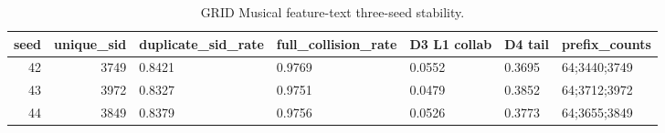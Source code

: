 \begin{table}
\caption{GRID Musical feature-text three-seed stability.}
\label{tab:grid-musical-3seed}
\begin{tabular}{rrlllll}
\toprule
seed & unique\_sid & duplicate\_sid\_rate & full\_collision\_rate & D3 L1 collab & D4 tail & prefix\_counts \\
\midrule
42 & 3749 & 0.8421 & 0.9769 & 0.0552 & 0.3695 & 64;3440;3749 \\
43 & 3972 & 0.8327 & 0.9751 & 0.0479 & 0.3852 & 64;3712;3972 \\
44 & 3849 & 0.8379 & 0.9756 & 0.0526 & 0.3773 & 64;3655;3849 \\
\bottomrule
\end{tabular}
\end{table}
